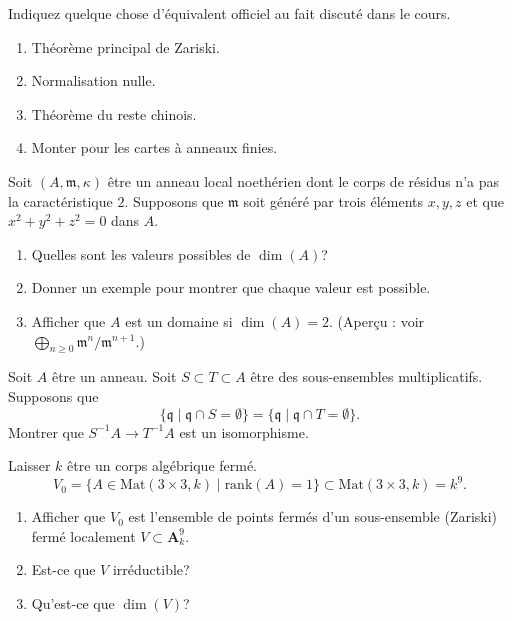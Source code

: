 \begin{exercise}[Results]
\label{exercise-results-fall-2011}
Indiquez quelque chose d'équivalent officiel au fait discuté dans
le cours.
\begin{enumerate}
\item Théorème principal de Zariski.
\item Normalisation nulle.
\item Théorème du reste chinois.
\item Monter pour les cartes à anneaux finies.
\end{enumerate}
\end{exercise}

\begin{exercise}
\label{exercise-dimension-of-ring}
Soit $(A, \mathfrak m, \kappa)$ être un anneau local noethérien dont le
corps de résidus n'a pas la caractéristique $2$. Supposons
que $\mathfrak m$ soit généré par trois éléments $x, y, z$ et
que $x^2 + y^2 + z^2 = 0$ dans $A$.
\begin{enumerate}
\item Quelles sont les valeurs possibles de $\dim(A)$?
\item Donner un exemple pour montrer que chaque valeur est possible.
\item Afficher que $A$ est un domaine si $\dim(A)
= 2$.
(Aperçu : voir $\bigoplus_{n \geq 0} \mathfrak m^n/\mathfrak m^{n + 1}$.)
\end{enumerate}
\end{exercise}

\begin{exercise}
\label{exercise-localization}
Soit $A$ être un
anneau. Soit $S \subset T \subset A$ être des sous-ensembles multiplicatifs.
Supposons que
$$
\{\mathfrak q \mid \mathfrak q \cap S = \emptyset\} =
\{\mathfrak q \mid \mathfrak q \cap T = \emptyset\}.
$$
Montrer que $S^{-1}A \to T^{-1}A$ est un isomorphisme.
\end{exercise}

\begin{exercise}
\label{exercise-locus-of-rank-1}
Laisser $k$ être un corps algébrique fermé.
$$
V_0 = \{ A \in \text{Mat}(3 \times 3, k) \mid \text{rank}(A) = 1\}
\subset \text{Mat}(3 \times 3, k) = k^9.
$$
\begin{enumerate}
\item Afficher que $V_0$ est l'ensemble de points
fermés d'un sous-ensemble (Zariski) fermé localement $V \subset \mathbf{A}^9_k$.
\item Est-ce que $V$ irréductible?
\item Qu'est-ce que $\dim(V)$?
\end{enumerate}
\end{exercise}

